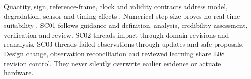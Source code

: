 Quantity, sign, reference-frame, clock and validity contracts address model, degradation, sensor and timing effects \citep[Secs.~4.1--4.2 and~6]{review-1251}. Numerical step size proves no real-time suitability \citep[Sec.~3]{review-0573}. SC01 follows guidance and definition, analysis, credibility assessment, verification and review. SC02 threads impact through domain revisions and reanalysis. SC03 threads failed observations through updates and safe proposals. Design change, observation reconciliation and reviewed learning share L08 revision control. They never silently overwrite earlier evidence or actuate hardware.
